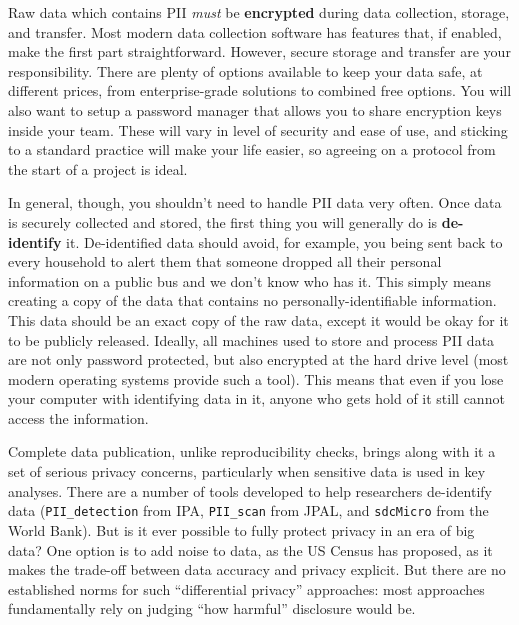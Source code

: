 Raw data which contains PII \textit{must} be \textbf{encrypted}
during data collection, storage, and transfer.
Most modern data collection software has features that, if enabled, make the first part straightforward.
However, secure storage and transfer are your responsibility.
There are plenty of options available to keep your data safe,
at different prices, from enterprise-grade solutions to combined free options.
You will also want to setup a password manager that allows you to share encryption keys inside your team.
These will vary in level of security and ease of use,
and sticking to a standard practice will make your life easier,
so agreeing on a protocol from the start of a project is ideal.

In general, though, you shouldn't need to handle PII data very often.
Once data is securely collected and stored, the first thing you will generally do is \textbf{de-identify} it.
De-identified data should avoid, for example, you being sent back to every household
to alert them that someone dropped all their personal information on a public bus and we don't know who has it.
This simply means creating a copy of the data that contains no personally-identifiable information.
This data should be an exact copy of the raw data,
except it would be okay for it to be publicly released.\cite{matthews2011data}
Ideally, all machines used to store and process PII data are not only password protected, but also encrypted at the hard drive level
(most modern operating systems provide such a tool).
This means that even if you lose your computer with identifying data in it,
anyone who gets hold of it still cannot access the information.

Complete data publication, unlike reproducibility checks,
brings along with it a set of serious privacy concerns,
particularly when sensitive data is used in key analyses.
There are a number of tools developed to help researchers de-identify data
(\texttt{PII_detection} from IPA,
\texttt{PII_scan} from JPAL,
and \texttt{sdcMicro} from the World Bank).
But is it ever possible to fully protect privacy in an era of big data?
One option is to add noise to data, as the US Census has proposed,
as it makes the trade-off between data accuracy and privacy explicit.
But there are no established norms for such “differential privacy” approaches:
most approaches fundamentally rely on judging “how harmful” disclosure would be.
